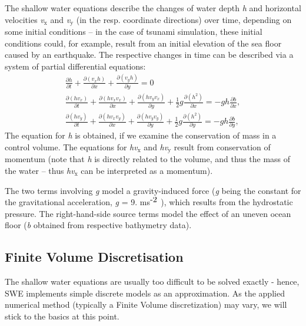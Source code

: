 The shallow water equations describe the changes of water depth {\itshape h} and horizontal velocities {\itshape v$_{\mbox{x}}$ } and {\itshape v$_{\mbox{y}}$ } (in the resp. coordinate directions) over time, depending on some initial conditions -- in the case of tsunami simulation, these initial conditions could, for example, result from an initial elevation of the sea floor caused by an earthquake. The respective changes in time can be described via a system of partial differential equations\-: \[ \begin{array}{c} \displaystyle \frac{\partial h}{\partial t} + \frac{\partial (v_x h)}{\partial x} + \frac{\partial (v_y h)}{\partial y} = 0 \\[1em] \displaystyle \frac{\partial (h v_x)}{\partial t} + \frac{\partial (h v_x v_x)}{\partial x} + \frac{\partial (h v_y v_x)}{\partial y} + \frac{1}{2} g \frac{\partial (h^2)}{\partial x} = - gh \frac{\partial b}{\partial x}, \\[1em] \displaystyle \frac{\partial (h v_y)}{\partial t} + \frac{\partial (h v_x v_y)}{\partial x} + \frac{\partial (h v_y v_y)}{\partial y} + \frac{1}{2} g \frac{\partial (h^2)}{\partial y} = - gh \frac{\partial b}{\partial y}, \end{array} \] The equation for {\itshape h} is obtained, if we examine the conservation of mass in a control volume. The equations for {\itshape hv$_{\mbox{x}}$ } and {\itshape hv$_{\mbox{y}}$ } result from conservation of momentum (note that {\itshape h} is directly related to the volume, and thus the mass of the water -- thus {\itshape hv$_{\mbox{x}}$ } can be interpreted as a momentum).

The two terms involving {\itshape g} model a gravity-\/induced force ({\itshape g} being the constant for the gravitational acceleration, {\itshape g} = 9. ms$^{\mbox{-\/2}}$ ), which results from the hydrostatic pressure. The right-\/hand-\/side source terms model the effect of an uneven ocean floor ({\itshape b} obtained from respective bathymetry data).\hypertarget{index_finvol}{}\subsection{Finite Volume Discretisation}\label{index_finvol}
The shallow water equations are usually too difficult to be solved exactly -\/ hence, S\-W\-E implements simple discrete models as an approximation. As the applied numerical method (typically a Finite Volume discretization) may vary, we will stick to the basics at this point.

